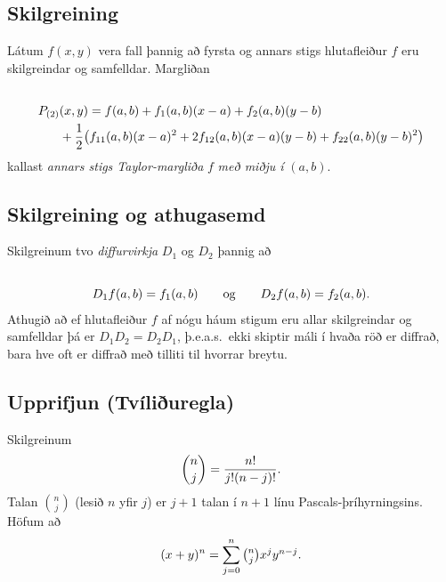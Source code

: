 \documentclass[a4paper,10pt,icelandic]{sphinxmanual}
\begin{document}
\subsection{Skilgreining}
\label{Kafli2:id52}
Látum \(f(x,y)\) vera fall þannig að fyrsta og annars stigs
hlutafleiður \(f\) eru skilgreindar og samfelldar. Margliðan
\begin{gather}
\begin{split}\displaystyle\end{split}\notag\\\begin{split}\begin{aligned}
P_{(2)}&(x,y)=f(a,b)+f_1(a,b)(x-a)+f_2(a,b)(y-b)\\
&+\frac{1}{2}\big(f_{11}(a,b)(x-a)^2+
2f_{12}(a,b)(x-a)(y-b)+f_{22}(a,b)(y-b)^2\big)\end{aligned}\end{split}\notag
\end{gather}
kallast \emph{annars stigs Taylor-margliða} \(f\) \emph{með miðju í}
\((a,b)\).


\subsection{Skilgreining og athugasemd}
\label{Kafli2:skilgreining-og-athugasemd}
Skilgreinum tvo \emph{diffurvirkja} \(D_1\) og \(D_2\) þannig að
\begin{gather}
\begin{split}\displaystyle\end{split}\notag\\\begin{split}D_1f(a,b)=f_1(a,b)\qquad\mbox{og}\qquad
D_2f(a,b)=f_2(a,b).\end{split}\notag
\end{gather}
Athugið að ef hlutafleiður \(f\) af nógu háum stigum eru allar
skilgreindar og samfelldar þá er \(D_1D_2=D_2D_1\), þ.e.a.s. ekki
skiptir máli í hvaða röð er diffrað, bara hve oft er diffrað með tilliti
til hvorrar breytu.


\subsection{Upprifjun (Tvíliðuregla)}
\label{Kafli2:upprifjun-tviliuregla}\label{Kafli2:index-32}
Skilgreinum
\begin{gather}
\begin{split}\displaystyle {n\choose j}=\frac{n!}{j!(n-j)!}.\end{split}\notag
\end{gather}
Talan \({n\choose j}\) (lesið \(n\) yfir \(j\)) er
\(j+1\) talan í \(n+1\) línu Pascals-þríhyrningsins. Höfum að
\begin{gather}
\begin{split}\displaystyle (x+y)^n=\sum_{j=0}^n \textstyle{n\choose j}x^jy^{n-j}.\end{split}\notag
\end{gather}
\end{document}
